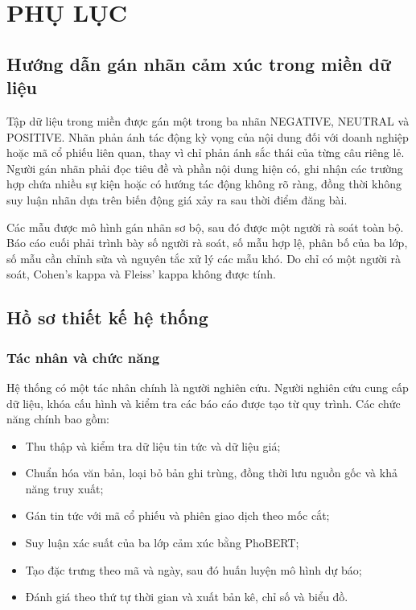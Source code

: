 \documentclass[12pt, a4paper, oneside]{report}
\begin{document}
\printbibliography[title={TÀI LIỆU THAM KHẢO}, heading=bibintoc]

\appendix
\chapter{PHỤ LỤC}
\label{ch:phu-luc}
\section{Hướng dẫn gán nhãn cảm xúc trong miền dữ liệu}

Tập dữ liệu trong miền được gán một trong ba nhãn NEGATIVE, NEUTRAL và POSITIVE. Nhãn phản ánh tác động kỳ vọng của nội dung đối với doanh nghiệp hoặc mã cổ phiếu liên quan, thay vì chỉ phản ánh sắc thái của từng câu riêng lẻ. Người gán nhãn phải đọc tiêu đề và phần nội dung hiện có, ghi nhận các trường hợp chứa nhiều sự kiện hoặc có hướng tác động không rõ ràng, đồng thời không suy luận nhãn dựa trên biến động giá xảy ra sau thời điểm đăng bài.

Các mẫu được mô hình gán nhãn sơ bộ, sau đó được một người rà soát toàn bộ. Báo cáo cuối phải trình bày số người rà soát, số mẫu hợp lệ, phân bố của ba lớp, số mẫu cần chỉnh sửa và nguyên tắc xử lý các mẫu khó. Do chỉ có một người rà soát, Cohen's kappa và Fleiss' kappa không được tính.
\section{Hồ sơ thiết kế hệ thống}

\subsection{Tác nhân và chức năng}

Hệ thống có một tác nhân chính là người nghiên cứu. Người nghiên cứu cung cấp dữ liệu,
khóa cấu hình và kiểm tra các báo cáo được tạo từ quy trình. Các chức năng chính bao gồm:

\begin{itemize}[nosep]
  \item Thu thập và kiểm tra dữ liệu tin tức và dữ liệu giá;
  \item Chuẩn hóa văn bản, loại bỏ bản ghi trùng, đồng thời lưu nguồn gốc và khả năng truy xuất;
  \item Gán tin tức với mã cổ phiếu và phiên giao dịch theo mốc cắt;
  \item Suy luận xác suất của ba lớp cảm xúc bằng PhoBERT;
  \item Tạo đặc trưng theo mã và ngày, sau đó huấn luyện mô hình dự báo;
  \item Đánh giá theo thứ tự thời gian và xuất bản kê, chỉ số và biểu đồ.
\end{itemize}
\end{document}

